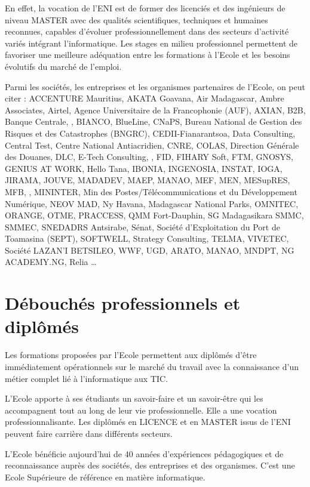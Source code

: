 \documentclass[12pt]{report}
\begin{document}
				En effet, la vocation de l’ENI est de former des licenciés et des ingénieurs de niveau MASTER avec des qualités scientifiques, techniques et humaines reconnues, capables d’évoluer professionnellement dans des secteurs d’activité variés intégrant l’informatique. Les stages en milieu professionnel permettent de favoriser une meilleure adéquation entre les formations à l’Ecole et les besoins évolutifs du marché de l’emploi.

				Parmi les sociétés, les entreprises et les organismes partenaires de l’Ecole, on peut citer : ACCENTURE Mauritius, AKATA Goavana, Air Madagascar, Ambre Associates, Airtel, Agence Universitaire de la Francophonie (AUF), AXIAN, B2B, Banque Centrale, , BIANCO, BlueLine, CNaPS, Bureau National de Gestion des Risques et des Catastrophes (BNGRC), CEDII-Fianarantsoa, Data Consulting, Central Test, Centre National Antiacridien, CNRE, COLAS, Direction Générale des Douanes, DLC, E-Tech Consulting, , FID, FIHARY Soft, FTM, GNOSYS, GENIUS AT WORK, Hello Tana, IBONIA, INGENOSIA, INSTAT, IOGA, JIRAMA, JOUVE, MADADEV, MAEP, MANAO, MEF, MEN, MESupRES, MFB, , MININTER, Min des Postes/Télécommunications et du Développement Numérique, NEOV MAD, Ny Havana, Madagascar National Parks, OMNITEC, ORANGE, OTME, PRACCESS, QMM Fort-Dauphin, SG Madagasikara SMMC, SMMEC, SNEDADRS Antsirabe, Sénat, Société d’Exploitation du Port de Toamasina (SEPT), SOFTWELL, Strategy Consulting, TELMA, VIVETEC, Société LAZAN’I BETSILEO, WWF, UGD, ARATO, MANAO, MNDPT, NG ACADEMY.NG, Relia … 			
				
				\section{Débouchés professionnels et diplômés}

				\hspace{15pt} Les formations proposées par l’Ecole permettent aux diplômés d’être immédiatement opérationnels sur le marché du travail avec la connaissance d’un métier complet lié à l’informatique aux TIC.

				L’Ecole apporte à ses étudiants un savoir-faire et un savoir-être qui les accompagnent tout au long de leur vie professionnelle. Elle a une vocation professionnalisante. Les diplômés en LICENCE et en MASTER issus de l’ENI peuvent faire carrière dans différents secteurs. 

				L’Ecole bénéficie aujourd’hui de 40 années d’expériences pédagogiques et de reconnaissance auprès des sociétés, des entreprises et des organismes. C’est une Ecole Supérieure de référence en matière informatique.
\end{document}
